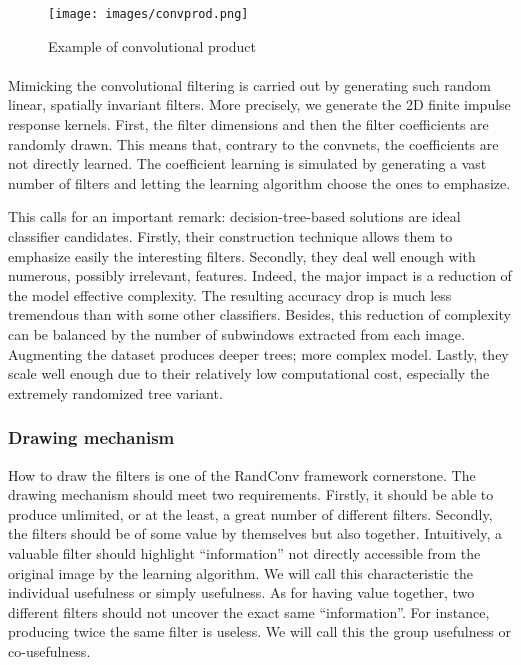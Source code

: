 \documentclass[a4paper]{report}
\begin{document}
		
		\begin{figure}
		\centering
			\texttt{[image: images/convprod.png]}
		\caption{\label{fig:convprod}Example of convolutional product}
	\end{figure}
		
		\paragraph{}
		Mimicking the convolutional filtering is carried out by generating such random linear, spatially invariant filters. More precisely, we generate the 2D finite impulse response kernels. First, the filter dimensions and then the filter coefficients are randomly drawn. This means that, contrary to the convnets, the coefficients are not directly learned. The coefficient learning is simulated by generating a vast number of filters and letting the learning algorithm choose the ones to emphasize. 
		\par
		This calls for an important remark: decision-tree-based solutions are ideal classifier candidates. Firstly, their construction technique allows them to emphasize easily the interesting filters. Secondly, they deal well enough with numerous, possibly irrelevant, features. Indeed, the major impact is a reduction of the model effective complexity. The resulting accuracy drop is much less tremendous than with some other classifiers. Besides, this reduction of complexity can be balanced by the number of subwindows extracted from each image. Augmenting the dataset produces deeper trees; more complex model. Lastly, they scale well enough due to their relatively low computational cost, especially the extremely randomized tree variant.
		
		
		
			
			
			\subsubsection{Drawing mechanism}
			How to draw the filters is one of the RandConv framework cornerstone. The drawing mechanism should meet two requirements. Firstly, it should be able to produce unlimited, or at the least, a great number of different filters. Secondly, the filters should be of some value by themselves but also together. Intuitively, a valuable filter should highlight ``information'' not directly accessible from the original image by the learning algorithm. We will call this characteristic the individual usefulness or simply usefulness. As for having value together, two different filters should not uncover the exact same ``information''. For instance, producing twice the same filter is useless. We will call this the group usefulness or co-usefulness.
			
\end{document}
